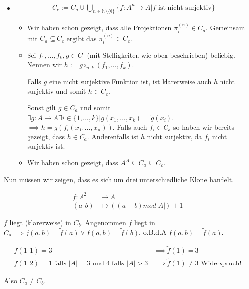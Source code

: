 \documentclass[]{article}
\begin{document}
\begin{itemize}
	\item
	
\begin{align*}
	C_c := C_a \cup \bigcup_{n\in\mathbb{N}\setminus\{0\}} \{f: A^n \rightarrow A \vert f \text{ ist nicht surjektiv}\}
\end{align*}

\begin{itemize}
	\item Wir haben schon gezeigt, dass alle Projektionen $\pi_i^{(n)} \in C_a$. Gemeinsam mit $C_a \subseteq C_c$ ergibt das $\pi_i^{(n)} \in C_c$.
	
	\item Sei $f_1,...,f_k,g \in C_c$ (mit Stelligkeiten wie oben beschrieben) beliebig. Nennen wir $h:=g\circ_{n,k}(f_1,...,f_k)$.
	
	Falls $g$ eine nicht surjektive Funktion ist, ist klarerweise auch $h$ nicht surjektiv und somit $h \in C_c$.
	
	Sonst gilt $g \in C_a$ und somit $\exists \tilde{g}:A\rightarrow A \exists i\in \{1, ..., k\} \vert g(x_1,...,x_k) = \tilde{g}(x_i)$. $\implies h=\tilde{g}(f_i(x_1, ..., x_n))$. Falls auch $f_i \in C_a$ so haben wir bereits gezeigt, dass $h \in C_a$. Anderenfalls ist $h$ nicht surjektiv, da $f_i$ nicht surjektiv ist.
	
	\item Wir haben schon gezeigt, dass $A^A \subseteq C_a \subseteq C_c$.
\end{itemize}
	
\end{itemize}

Nun müssen wir zeigen, dass es sich um drei unterschiedliche Klone handelt.

\begin{align*}
	f:A^2 &\rightarrow A\\
	(a, b) &\mapsto ((a+b)mod |A|) + 1
\end{align*}

$f$ liegt (klarerweise) in $C_b$. Angenommen $f$ liegt in $C_a \implies f(a,b)=\tilde{f}(a) \lor f(a,b)=\tilde{f}(b)$. o.B.d.A $f(a,b)=\tilde{f}(a)$.

\begin{align*}
	f(1, 1) = 3 &\implies \tilde{f}(1) = 3\\
	f(1, 2) = 1 \text{ falls } |A| = 3 \text{ und } 4 \text{ falls } |A| > 3 &\implies \tilde{f}(1) \neq 3 \text{ Widerspruch!}
\end{align*}

Also $C_a \neq C_b$.
\end{document}
